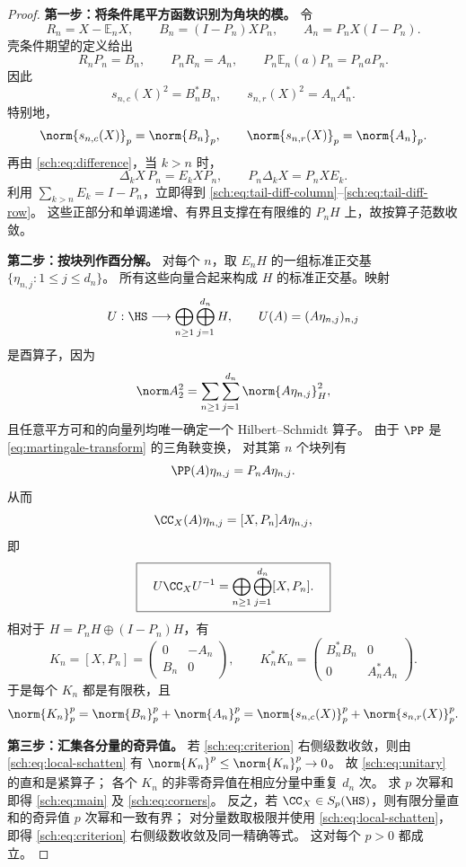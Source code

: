 \begin{proof}
\textbf{第一步：将条件尾平方函数识别为角块的模。}
令
\[
 R_n=X-\mathbb E_nX,\qquad
 B_n=(I-P_n)XP_n,\qquad A_n=P_nX(I-P_n).
\]
壳条件期望的定义给出
\[
 R_nP_n=B_n,\qquad P_nR_n=A_n,
 \qquad P_n\mathbb E_n(a)P_n=P_naP_n.
\]
因此
\begin{equation}\label{sch:eq:tail-moduli}
 s_{n,c}(X)^2=B_n^*B_n,\qquad
 s_{n,r}(X)^2=A_nA_n^*.
\end{equation}
特别地，
\[
 \norm{s_{n,c}(X)}_p=\norm{B_n}_p,
 \qquad \norm{s_{n,r}(X)}_p=\norm{A_n}_p.
\]
再由 \eqref{sch:eq:difference}，当 $k>n$ 时，
\[
 \Delta_kX\,P_n=E_kXP_n,\qquad
 P_n\Delta_kX=P_nXE_k.
\]
利用 $\sum_{k>n}E_k=I-P_n$，立即得到
\eqref{sch:eq:tail-diff-column}--\eqref{sch:eq:tail-diff-row}。
这些正部分和单调递增、有界且支撑在有限维的 $P_nH$ 上，故按算子范数收敛。

\medskip
\textbf{第二步：按块列作酉分解。}
对每个 $n$，取 $E_nH$ 的一组标准正交基
$\{\eta_{n,j}:1\leq j\leq d_n\}$。
所有这些向量合起来构成 $H$ 的标准正交基。映射
\[
 U:\HS\longrightarrow\bigoplus_{n\geq1}\bigoplus_{j=1}^{d_n}H,
 \qquad U(A)=(A\eta_{n,j})_{n,j}
\]
是酉算子，因为
\[
 \norm A_2^2=\sum_{n\geq1}\sum_{j=1}^{d_n}\norm{A\eta_{n,j}}_H^2,
\]
且任意平方可和的向量列均唯一确定一个 Hilbert--Schmidt 算子。
由于 $\PP$ 是 \eqref{eq:martingale-transform} 的三角鞅变换，
对其第 $n$ 个块列有
\[
 \PP(A)\eta_{n,j}=P_nA\eta_{n,j}.
\]
从而
\[
 \CC_X(A)\eta_{n,j}=[X,P_n]A\eta_{n,j},
\]
即
\begin{equation}\label{sch:eq:unitary}
 \boxed{\quad
 U\CC_XU^{-1}
 =\bigoplus_{n\geq1}\bigoplus_{j=1}^{d_n}[X,P_n].
 \quad}
\end{equation}
相对于 $H=P_nH\oplus(I-P_n)H$，有
\[
 K_n=[X,P_n]=\begin{pmatrix}0&-A_n\\B_n&0\end{pmatrix},
 \qquad
 K_n^*K_n=\begin{pmatrix}B_n^*B_n&0\\0&A_n^*A_n\end{pmatrix}.
\]
于是每个 $K_n$ 都是有限秩，且
\begin{equation}\label{sch:eq:local-schatten}
 \norm{K_n}_p^p
 =\norm{B_n}_p^p+\norm{A_n}_p^p
 =\norm{s_{n,c}(X)}_p^p+\norm{s_{n,r}(X)}_p^p.
\end{equation}

\medskip
\textbf{第三步：汇集各分量的奇异值。}
若 \eqref{sch:eq:criterion} 右侧级数收敛，则由
\eqref{sch:eq:local-schatten} 有 $\norm{K_n}^p\leq\norm{K_n}_p^p\to0$。
故 \eqref{sch:eq:unitary} 的直和是紧算子；
各个 $K_n$ 的非零奇异值在相应分量中重复 $d_n$ 次。
求 $p$ 次幂和即得 \eqref{sch:eq:main} 及 \eqref{sch:eq:corners}。
反之，若 $\CC_X\in S_p(\HS)$，则有限分量直和的奇异值 $p$ 次幂和一致有界；
对分量数取极限并使用 \eqref{sch:eq:local-schatten}，即得
\eqref{sch:eq:criterion} 右侧级数收敛及同一精确等式。
这对每个 $p>0$ 都成立。
\end{proof}


